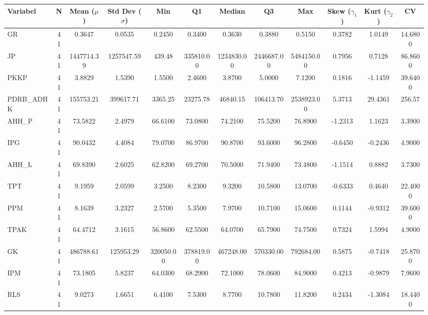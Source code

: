 \begin{adjustbox}{max width=\textwidth}
\small
\begin{tabular}{|p{2.5cm}|c|c|c|c|c|c|c|c|c|c|c|}
\hline
\textbf{Variabel} & \textbf{N} & \textbf{Mean ($\mu$)} & \textbf{Std Dev ($\sigma$)} & \textbf{Min} & \textbf{Q1} & \textbf{Median} & \textbf{Q3} & \textbf{Max} & \textbf{Skew ($\gamma_1$)} & \textbf{Kurt ($\gamma_2$)} & \textbf{CV} \\
\hline
GR & 41 & 0.3647 & 0.0535 & 0.2450 & 0.3400 & 0.3630 & 0.3880 & 0.5150 & 0.3782 & 1.0149 & 14.6800 \\
JP & 41 & 1447714.39 & 1257547.59 & 439.48 & 335810.00 & 1234830.00 & 2446687.00 & 5484150.00 & 0.7956 & 0.7128 & 86.8600 \\
PKKP & 41 & 3.8829 & 1.5390 & 1.5500 & 2.4600 & 3.8700 & 5.0000 & 7.1200 & 0.1816 & -1.1459 & 39.6400 \\
PDRB\_ADHK & 41 & 155753.21 & 399617.71 & 3365.25 & 23275.78 & 46840.15 & 106413.70 & 2538923.00 & 5.3713 & 29.4361 & 256.57 \\
AHH\_P & 41 & 73.5822 & 2.4979 & 66.6100 & 73.0800 & 74.2100 & 75.5200 & 76.8900 & -1.2313 & 1.1623 & 3.3900 \\
IPG & 41 & 90.0432 & 4.4084 & 79.0700 & 86.9700 & 90.8700 & 93.6000 & 96.2800 & -0.6450 & -0.2436 & 4.9000 \\
AHH\_L & 41 & 69.8390 & 2.6025 & 62.8200 & 69.2700 & 70.5000 & 71.9400 & 73.4800 & -1.1514 & 0.8882 & 3.7300 \\
TPT & 41 & 9.1959 & 2.0599 & 3.2500 & 8.2300 & 9.3200 & 10.5800 & 13.0700 & -0.6333 & 0.4640 & 22.4000 \\
PPM & 41 & 8.1639 & 3.2327 & 2.5700 & 5.3500 & 7.9700 & 10.7100 & 15.0600 & 0.1144 & -0.9312 & 39.6000 \\
TPAK & 41 & 64.4712 & 3.1615 & 56.8600 & 62.5500 & 64.0700 & 65.7900 & 74.7500 & 0.7324 & 1.5994 & 4.9000 \\
GK & 41 & 486788.61 & 125953.29 & 320050.00 & 378819.00 & 467248.00 & 570330.00 & 792684.00 & 0.5875 & -0.7418 & 25.8700 \\
IPM & 41 & 73.1805 & 5.8237 & 64.0300 & 68.2900 & 72.1000 & 78.0600 & 84.9000 & 0.4213 & -0.9879 & 7.9600 \\
RLS & 41 & 9.0273 & 1.6651 & 6.4100 & 7.5300 & 8.7700 & 10.7800 & 11.8200 & 0.2434 & -1.3084 & 18.4400 \\
\hline
\end{tabular}
\end{adjustbox}
